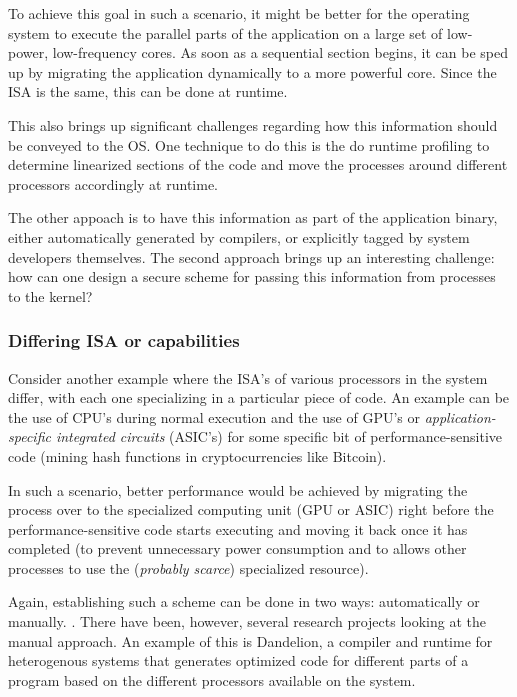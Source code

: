 To achieve this goal in such a scenario, it might be better for the operating system to execute the parallel parts of the application on a large set of low-power, low-frequency cores. As soon as a sequential section begins, it can be sped up by migrating the application dynamically to a more powerful core. Since the ISA is the same, this can be done at runtime.

This also brings up significant challenges regarding how this information should be conveyed to the OS. One technique to do this is the do runtime profiling to determine linearized sections of the code and move the processes around different processors accordingly at runtime.

The other appoach is to have this information as part of the application binary, either automatically generated by compilers, or explicitly tagged by system developers themselves. The second approach brings up an interesting challenge: how can one design a secure scheme for passing this information from processes to the kernel?


\subsubsection{Differing ISA or capabilities}
Consider another example where the ISA's of various processors in the system differ, with each one specializing in a particular piece of code. An example can be the use of CPU's during normal execution and the use of GPU's or \emph{application-specific integrated circuits} (ASIC's) for some specific bit of performance-sensitive code (\eg mining hash functions in cryptocurrencies like Bitcoin).

In such a scenario, better performance would be achieved by migrating the process over to the specialized computing unit (GPU or ASIC) right before the performance-sensitive code starts executing and moving it back once it has completed (to prevent unnecessary power consumption and to allows other processes to use the (\emph{probably scarce}) specialized resource).

Again, establishing such a scheme can be done in two ways: automatically or manually. . There have been, however, several research projects looking at the manual approach. An example of this is Dandelion, a compiler and runtime for heterogenous systems that generates optimized code for different parts of a program based on the different processors available on the system.

